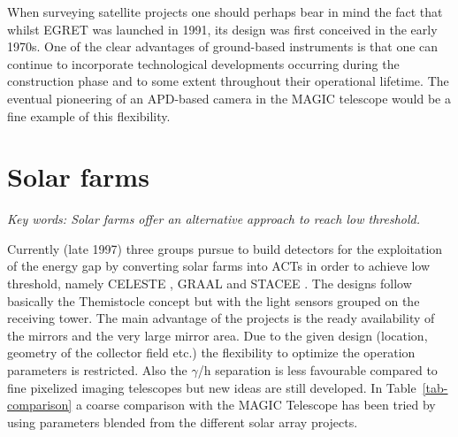 When surveying satellite projects one should perhaps bear in mind the fact
that whilst EGRET was launched in 1991, its design was first conceived in
the early 1970s. One of the clear advantages of ground-based instruments is
that one can continue to incorporate technological developments occurring
during the construction phase and to some extent throughout their
operational lifetime. The eventual pioneering of an APD-based camera in the
MAGIC telescope would be a fine example of this flexibility.


\section{Solar farms}

{\it Key words: Solar farms offer an alternative approach to reach low
threshold.}

\medskip Currently (late 1997) three groups pursue to build detectors for
the exploitation of the energy gap by converting solar farms into ACTs in
order to achieve low threshold, namely CELESTE \cite{celeste:95}, GRAAL
\cite{graal:97} and STACEE \cite{ragan:97}.
The designs follow basically the Themistocle concept \cite{fleury:94} but
with the light sensors grouped on the receiving tower. The main advantage of
the projects is the ready availability of the mirrors and the very large
mirror area. Due to the given design (location, geometry of the collector
field etc.) the flexibility to optimize the operation parameters is
restricted. Also the $\gamma$/h separation is less favourable compared to
fine pixelized imaging telescopes but new ideas are still developed. In
Table~\ref{tab-comparison} a coarse comparison with the MAGIC 
Telescope has been tried by using
parameters blended from the different solar array projects.

